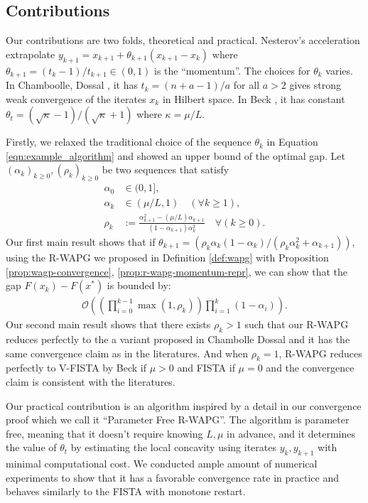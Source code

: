 \documentclass[12pt]{article}
\begin{document}
    \subsection{Contributions}
        Our contributions are two folds, theoretical and practical. 
        Nesterov's acceleration extrapolate $y_{k + 1} = x_{k + 1} + \theta_{k + 1}(x_{k + 1} - x_k)$ where $\theta_{k + 1} = (t_{k} - 1)/t_{k + 1} \in (0, 1)$ is the ``momentum''. 
        The choices for $\theta_k$ varies. 
        In Chamboolle, Dossal \cite{chambolle_convergence_2015}, it has $t_k = (n + a - 1)/a$ for all $a > 2$ gives strong weak convergence of the iterates $x_k$ in Hilbert space. 
        In Beck \cite{beck_first-order_2017}, it has constant $\theta_t = (\sqrt{\kappa} - 1)/(\sqrt{\kappa} + 1)$ where $\kappa = \mu/L$. 
        \par
        Firstly, we relaxed the traditional choice of the sequence $\theta_k$ in Equation \ref{eqn:example_algorithm} and showed an upper bound of the optimal gap. 
        Let $(\alpha_k)_{k \ge0}, (\rho_k)_{k \ge 0}$ be two sequences that satisfy
        \begin{align*}
            \alpha_0 &\in (0, 1], 
            \\
            \alpha_k &\in (\mu/L, 1) \quad (\forall k \ge 1), 
            \\
            \rho_k &:= \frac{\alpha_{k + 1}^2 - (\mu/L)\alpha_{k + 1}}{(1 - \alpha_{k + 1})\alpha_k^2} \quad \forall (k \ge 0). 
        \end{align*}
        Our first main result shows that if $\theta_{k + 1} = (\rho_k\alpha_k(1 - \alpha_k)/(\rho_k\alpha_k^2 + \alpha_{k + 1}))$, using the R-WAPG we proposed in Definition \ref{def:wapg} with Proposition \ref{prop:wagp-convergence}, \ref{prop:r-wapg-momentum-repr}, we can show that the gap $F(x_k) - F(x^*)$ is bounded by:
        \begin{align*}
            \mathcal O\left(
                \left(
                    \prod_{i = 0}^{k - 1} \max(1, \rho_{k})
                \right)
                \prod_{i = 1}^{k} \left(1  - \alpha_i\right)
            \right). 
        \end{align*}
        Our second main result shows that there exists $\rho_k > 1$ such that our R-WAPG reduces perfectly to the a variant proposed in Chambolle Dossal \cite{chambolle_convergence_2015} and it has the same convergence claim as in the literatures. 
        And when $\rho_k = 1$, R-WAPG reduces perfectly to V-FISTA by Beck \cite{beck_first-order_2017} if $\mu > 0$ and FISTA if $\mu = 0$ and the convergence claim is consistent with the literatures. 
        \par
        Our practical contribution is an algorithm inspired by a detail in our convergence proof which we call it ``Parameter Free R-WAPG''. 
        The algorithm is parameter free, meaning that it doesn't require knowing $L, \mu$ in advance, and it determines the value of $\theta_t$ by estimating the local concavity using iterates $y_{k}, y_{k + 1}$ with minimal computational cost. 
        We conducted ample amount of numerical experiments to show that it has a favorable convergence rate in practice and behaves similarly to the FISTA with monotone restart. 
\end{document}
